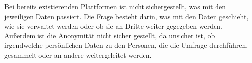 \author{Weissengruber Nina}
Bei bereits existierenden Plattformen ist nicht sichergestellt, was mit den jeweiligen Daten passiert. 
Die Frage besteht darin, was mit den Daten geschieht, wie sie verwaltet werden oder ob sie an Dritte 
weiter gegegeben werden. Außerdem ist die Anonymität nicht sicher gestellt, 
da unsicher ist, ob irgendwelche persönlichen Daten zu den Personen, die die Umfrage durchführen, gesammelt oder 
an andere weitergeleitet werden.
